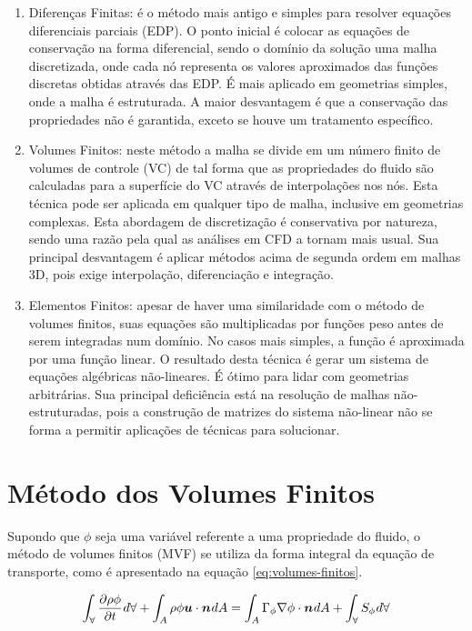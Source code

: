 \begin{enumerate}
    \item Diferenças Finitas: é o método mais antigo e simples para resolver equações diferenciais parciais (EDP). O ponto inicial é colocar as equações de conservação na forma diferencial, sendo o domínio da solução uma malha discretizada, onde cada nó representa os valores aproximados das funções discretas obtidas através das EDP. É mais aplicado em geometrias simples, onde a malha é estruturada. A maior desvantagem é que a conservação das propriedades não é garantida, exceto se houve um tratamento específico.
    \item Volumes Finitos: neste método a malha se divide em um número finito de volumes de controle (VC) de tal forma que as propriedades do fluido são calculadas para a superfície do VC através de interpolações nos nós. Esta técnica pode ser aplicada em qualquer tipo de malha, inclusive em geometrias complexas. Esta abordagem de discretização é conservativa por natureza, sendo uma razão pela qual as análises em CFD a tornam mais usual. Sua principal desvantagem é aplicar métodos acima de segunda ordem em malhas 3D, pois exige interpolação, diferenciação e integração.
    \item Elementos Finitos: apesar de haver uma similaridade com o método de volumes finitos, suas equações são multiplicadas por funções peso antes de serem integradas num domínio. No casos mais simples, a função é aproximada por uma função linear. O resultado desta técnica é gerar um sistema de equações algébricas não-lineares. É ótimo para lidar com geometrias arbitrárias. Sua principal deficiência está na resolução de malhas não-estruturadas, pois a construção de matrizes do sistema não-linear não se forma a permitir aplicações de técnicas para solucionar.
\end{enumerate}

\section{Método dos Volumes Finitos}

Supondo que $\phi$ seja uma variável referente a uma propriedade do fluido, o método de volumes finitos (MVF) se utiliza da forma integral da equação de transporte, como é apresentado na equação \ref{eq:volumes-finitos}.

\begin{equation}
    \label{eq:volumes-finitos}
    \int_{\forall} \frac{\partial \rho\phi}{\partial t} \hspace{0.5pt} d\forall + \int_{A} \rho\phi\boldsymbol{u}\cdot\boldsymbol{n}\hspace{0.5pt} dA = \int_{A} \Gamma_{\phi}\nabla\phi\cdot\boldsymbol{n}\hspace{0.5pt} dA + \int_{\forall} S_{\phi}\hspace{0.5pt} d\forall
\end{equation}

